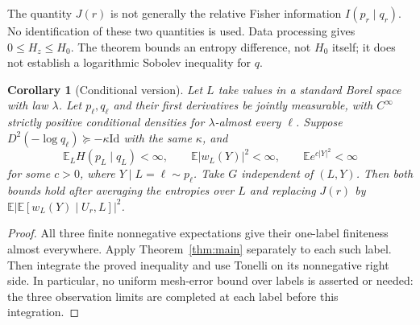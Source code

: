 \documentclass[11pt]{article}
\newtheorem{corollary}[theorem]{Corollary}
\theoremstyle{remark}\newtheorem{remark}[theorem]{Remark}
\newcommand{\E}{\mathbb E}
\newcommand{\Id}{\mathrm{Id}}
\begin{document}
The quantity $J(r)$ is not generally the relative Fisher information
$I(p_r\mid q_r)$. No identification of these two quantities is used.
Data processing gives $0\le H_z\le H_0$.
The theorem bounds an entropy difference, not $H_0$ itself; it does not establish
a logarithmic Sobolev inequality for $q$.

\begin{corollary}[Conditional version]\label{cor:conditional}
Let $L$ take values in a standard Borel space with law $\lambda$.
Let $p_\ell,q_\ell$ and their first derivatives be jointly measurable, with
$C^\infty$ strictly positive conditional densities for $\lambda$-almost every
$\ell$. Suppose $D^2(-\log q_\ell)\succeq-\kappa\Id$ with the same $\kappa$,
and
\[
\E_L H(p_L\mid q_L)<\infty,\qquad
\E|w_L(Y)|^2<\infty,\qquad \E e^{c|Y|^2}<\infty
\]
for some $c>0$, where $Y\mid L=\ell\sim p_\ell$.
Take $G$ independent of $(L,Y)$. Then both bounds hold after averaging the
entropies over $L$ and replacing $J(r)$ by
$\E|\E[w_L(Y)\mid U_r,L]|^2$.
\end{corollary}
\begin{proof}
All three finite nonnegative expectations give their one-label finiteness
almost everywhere. Apply Theorem~\ref{thm:main} separately to each such label.
Then integrate the proved inequality and use Tonelli on its nonnegative
right side. In particular, no uniform mesh-error bound over labels is asserted
or needed: the three observation limits are completed at each label before
this integration.
\end{proof}
\end{document}
